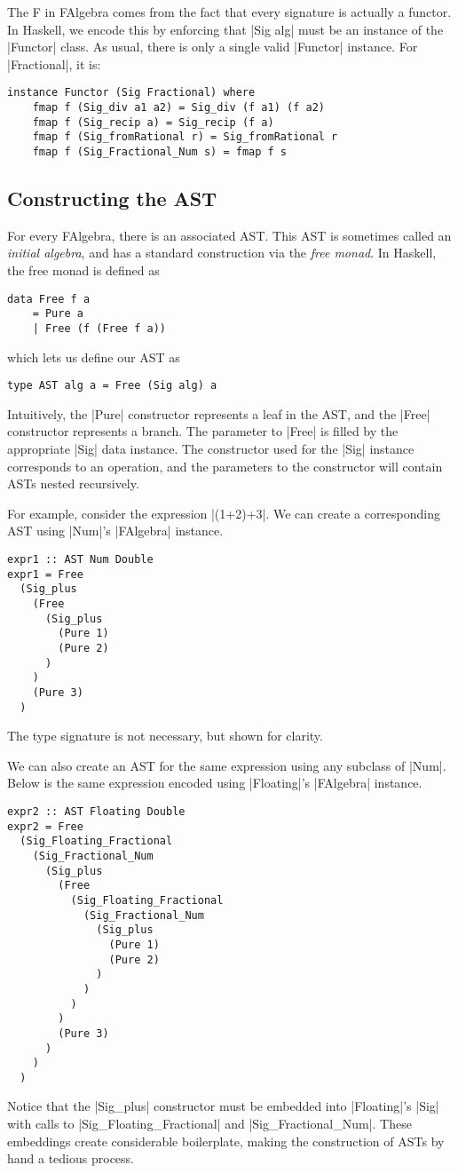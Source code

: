 \documentclass[preprint]{sigplanconf}
\theoremstyle{definition}
\begin{document}
The F in FAlgebra comes from the fact that every signature is actually a functor.
In Haskell, we encode this by enforcing that |Sig alg| must be an instance of the |Functor| class.
As usual, there is only a single valid |Functor| instance.
For |Fractional|, it is:
\begin{lstlisting}
instance Functor (Sig Fractional) where
    fmap f (Sig_div a1 a2) = Sig_div (f a1) (f a2)
    fmap f (Sig_recip a) = Sig_recip (f a)
    fmap f (Sig_fromRational r) = Sig_fromRational r
    fmap f (Sig_Fractional_Num s) = fmap f s
\end{lstlisting}

\subsection{Constructing the AST}

For every FAlgebra, there is an associated AST.
This AST is sometimes called an \emph{initial algebra},
and has a standard construction via the \emph{free monad}.
In Haskell, the free monad is defined as
\begin{lstlisting}
data Free f a
    = Pure a
    | Free (f (Free f a))
\end{lstlisting}
which lets us define our AST as
\begin{lstlisting}
type AST alg a = Free (Sig alg) a
\end{lstlisting}
Intuitively,
the |Pure| constructor represents a leaf in the AST,
and the |Free| constructor represents a branch.
The parameter to |Free| is filled by the appropriate |Sig| data instance.
The constructor used for the |Sig| instance corresponds to an operation,
and the parameters to the constructor will contain ASTs nested recursively.

For example, consider the expression |(1+2)+3|.
We can create a corresponding AST using |Num|'s |FAlgebra| instance.
\begin{lstlisting}
expr1 :: AST Num Double
expr1 = Free
  (Sig_plus
    (Free
      (Sig_plus
        (Pure 1)
        (Pure 2)
      )
    )
    (Pure 3)
  )
\end{lstlisting}
The type signature is not necessary, but shown for clarity.

We can also create an AST for the same expression using any subclass of |Num|.
Below is the same expression encoded using |Floating|'s |FAlgebra| instance.
\begin{lstlisting}
expr2 :: AST Floating Double
expr2 = Free
  (Sig_Floating_Fractional
    (Sig_Fractional_Num
      (Sig_plus
        (Free
          (Sig_Floating_Fractional
            (Sig_Fractional_Num
              (Sig_plus
                (Pure 1)
                (Pure 2)
              )
            )
          )
        )
        (Pure 3)
      )
    )
  )
\end{lstlisting}
Notice that the |Sig_plus| constructor must be embedded into |Floating|'s |Sig| with calls to |Sig_Floating_Fractional| and |Sig_Fractional_Num|.
These embeddings create considerable boilerplate,
making the construction of ASTs by hand a tedious process.
\end{document}

